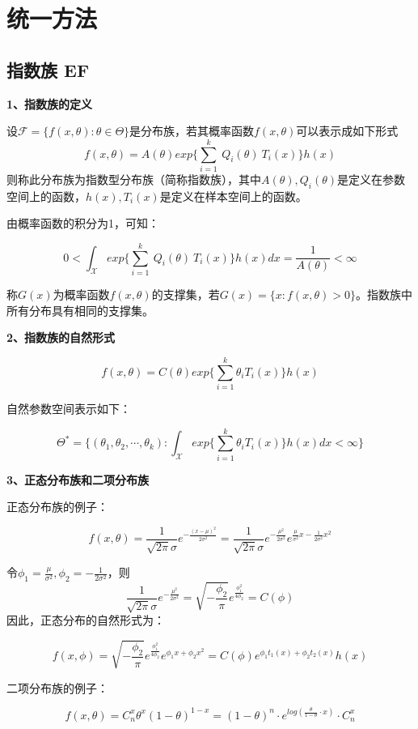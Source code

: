 \documentclass[
]{book}
\begin{document}
\section{统一方法}\label{ux7edfux4e00ux65b9ux6cd5}

\subsection{指数族 EF}\label{ux6307ux6570ux65cf-ef}

\textbf{1、指数族的定义}

设\(\mathcal{F} =\{f(x,\theta):\theta\in\Theta\}\)是分布族，若其概率函数\(f(x,\theta)\)可以表示成如下形式 \[
f(x,\theta) = A(\theta)exp\{\sum_{i=1}^k\ Q_i(\theta)\ T_i(x)\}h(x)
\] 则称此分布族为指数型分布族（简称指数族），其中\(A(\theta),Q_i(\theta)\)是定义在参数空间上的函数，\(h(x),T_i(x)\)是定义在样本空间上的函数。

由概率函数的积分为1，可知：

\[
0<\int_{\mathcal{X}}exp\{\sum_{i=1}^k\ Q_i(\theta)\ T_i(x) \}h(x)dx = \frac{1}{A(\theta)}<\infty
\]

称\(G(x)\)为概率函数\(f(x,\theta)\)的支撑集，若\(G(x) = \{x:f(x,\theta)>0\}\)。指数族中所有分布具有相同的支撑集。

\textbf{2、指数族的自然形式}

\[
f(x,\theta) = C(\theta)exp\{\sum_{i=1}^k\theta_iT_i(x) \}h(x)
\]

自然参数空间表示如下：

\[
\Theta^* = \{(\theta_1,\theta_2,\cdots,\theta_k):\int_{\mathcal{X}}exp\{\sum_{i=1}^k\theta_iT_i(x) \}h(x)dx<\infty \}
\]

\textbf{3、正态分布族和二项分布族}

正态分布族的例子：

\[
f(x,\theta) = \frac{1}{\sqrt{2\pi}\sigma} e^{-\frac{(x-\mu)^2}{2\sigma^2}} = \frac{1}{\sqrt{2\pi}\sigma} e^{-\frac{\mu^2}{2\sigma^2}} e^{\frac{\mu}{\sigma^2}x-\frac{1}{2\sigma^2}x^2}
\]

令\(\phi_1 = \frac{\mu}{\sigma^2},\phi_2 =-\frac{1}{2\sigma^2}\)，则 \[
\frac{1}{\sqrt{2\pi}\sigma}e^{-\frac{\mu^2}{2\sigma^2}} = \sqrt{-\frac{\phi_2}{\pi}}e^{\frac{\phi_1^2}{4\phi_2}} = C(\phi)
\] 因此，正态分布的自然形式为：

\[
f(x,\phi) = \sqrt{-\frac{\phi_2}{\pi}}e^{\frac{\phi_1^2}{4\phi_2}} e^{\phi_1x + \phi_2x^2} = C(\phi)e^{\phi_1t_1(x)+\phi_2t_2(x)}h(x)
\]

二项分布族的例子：

\[
f(x,\theta) = C_n^x\theta^x(1-\theta)^{1-x} = (1-\theta)^n\cdot e^{log(\frac{\theta}{1-\theta}\cdot x)}\cdot C_n^x
\]
\end{document}
